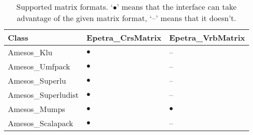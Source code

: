 \documentclass[11pt]{SANDreport}
\begin{document}
\begin{table}[tbhp]
  \centering
  \begin{tabular}{| p{7cm} | p{3cm} | p{3cm} | }
    \hline
    Class &  Epetra\_CrsMatrix & Epetra\_VrbMatrix \\
    \hline
    Amesos\_Klu &  $\bullet$ & -- \\
    Amesos\_Umfpack & $\bullet$ & -- \\
    Amesos\_Superlu & $\bullet$ & -- \\
    Amesos\_Superludist & $\bullet$ & -- \\
    Amesos\_Mumps & $\bullet$ & $\bullet$ \\
    Amesos\_Scalapack & $\bullet$ & -- \\
    \hline
  \end{tabular}
  \caption{Supported matrix formats. `$\bullet$' means that the interface
    can take advantage of the given matrix format, `--' means that it doesn't.}
  \label{tab:matrices}
\end{table}
\end{document}
